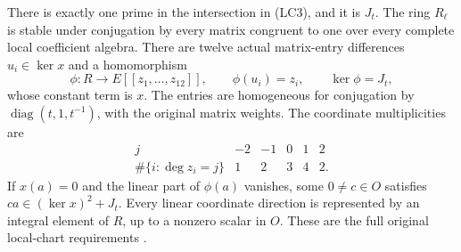 \begin{theorem}
\label{thm:support-local-chart}
There is exactly one prime in the intersection in (LC3), and it is
$J_t$.  The ring $R_\ell$ is stable under conjugation by every matrix
congruent to one over every complete local coefficient algebra.
There are twelve actual matrix-entry differences $u_i\in\ker x$
and a homomorphism
\[
 \phi:R\longrightarrow E[[z_1,\ldots,z_{12}]],\qquad
 \phi(u_i)=z_i,\qquad \ker\phi=J_t,
                                                               \tag{LC4}
\]
whose constant term is $x$.  The entries are homogeneous for
conjugation by $\operatorname{diag}(t,1,t^{-1})$, with the original
matrix weights.  The coordinate multiplicities are
\[
\begin{array}{c|rrrrr}
 j&-2&-1&0&1&2\\ \hline
 \#\{i:\deg z_i=j\}&1&2&3&4&2.
\end{array}                                                    \tag{LC5}
\]
If $x(a)=0$ and the linear part of $\phi(a)$ vanishes, some
$0\ne c\in O$ satisfies
$ca\in (\ker x)^2+J_t$.  Every linear coordinate direction is
represented by an integral element of $R$, up to a nonzero scalar
in $O$.  These are the full original local-chart requirements
\cite{support-local-chart-source}.
\end{theorem}

